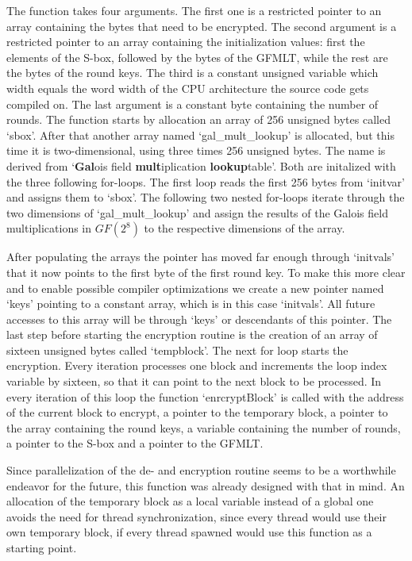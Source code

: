 The function takes four arguments. The first one is a restricted pointer
to an array containing the bytes that need to be encrypted. The second
argument is a restricted pointer to an array containing the
initialization values: first the elements of the S-box, followed by the
bytes of the GFMLT, while the rest are the bytes of the round keys. The
third is a constant unsigned variable which width equals the word width
of the CPU architecture the source code gets compiled on. The last
argument is a constant byte containing the number of rounds. The
function starts by allocation an array of 256 unsigned bytes called
`sbox'. After that another array named `gal\_mult\_lookup' is allocated,
but this time it is two-dimensional, using three times 256 unsigned
bytes. The name is derived from `\textbf{Gal}ois field
\textbf{mult}iplication \textbf{lookup}table'. Both are initalized with
the three following for-loops. The first loop reads the first 256 bytes
from `initvar' and assigns them to `sbox'. The following two nested
for-loops iterate through the two dimensions of `gal\_mult\_lookup' and
assign the results of the Galois field multiplications in $GF(2^{8})$ to the
respective dimensions of the array.

After populating the arrays the pointer has moved far enough through
`initvals' that it now points to the first byte of the first round key.
To make this more clear and to enable possible compiler optimizations we
create a new pointer named `keys' pointing to a constant array, which is
in this case `initvals'. All future accesses to this array will be
through `keys' or descendants of this pointer. The last step before
starting the encryption routine is the creation of an array of sixteen
unsigned bytes called `tempblock'. The next for loop starts the
encryption. Every iteration processes one block and increments the loop
index variable by sixteen, so that it can point to the next block to be
processed. In every iteration of this loop the function `enrcryptBlock'
is called with the address of the current block to encrypt, a pointer to
the temporary block, a pointer to the array containing the round keys, a
variable containing the number of rounds, a pointer to the S-box and a
pointer to the GFMLT.

Since parallelization of the de- and encryption routine seems to be a
worthwhile endeavor for the future, this function was already designed
with that in mind. An allocation of the temporary block as a local
variable instead of a global one avoids the need for thread
synchronization, since every thread would use their own temporary block,
if every thread spawned would use this function as a starting point.
